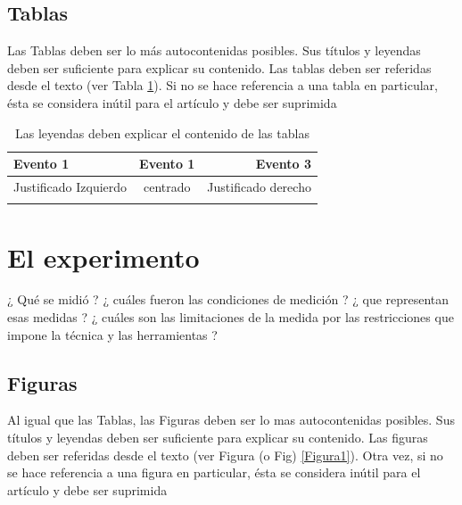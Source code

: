 \documentclass[notitlepage,letterpaper,12pt]{article} %
\begin{document}
\subsection{Tablas}
Las Tablas deben ser lo más autocontenidas posibles. Sus títulos y  leyendas deben ser suficiente para explicar su contenido. Las tablas deben ser referidas desde el texto (ver Tabla \ref{Tabla1}). Si no se hace referencia a una tabla en particular, ésta se considera inútil para el artículo y debe ser suprimida

\begin{table}
  \centering
\begin{tabular}{l|c|r} %
\hline %
  Evento 1 & Evento 1  & Evento 3  \\ \hline
  Justificado Izquierdo & centrado & Justificado derecho \\
   &  &  \\ \hline \hline
\hline
\end{tabular}
  \caption{Las leyendas deben explicar el contenido de las tablas} %
  \label{Tabla1} %
\end{table}

\section{El experimento}
¿ Qué se midió ? ¿ cuáles fueron las condiciones de medición ? ¿ que representan esas medidas ? ¿ cuáles son las limitaciones de la medida por las restricciones que impone la técnica y las herramientas ?

\subsection{Figuras}
Al igual que las Tablas, las Figuras deben ser lo mas autocontenidas posibles. Sus títulos y  leyendas deben ser suficiente para explicar su contenido. Las figuras deben ser referidas desde el texto (ver Figura (o Fig) \ref{Figura1}). Otra vez, si no se hace referencia a una figura en particular, ésta se considera inútil para el artículo y debe ser suprimida
\end{document}
